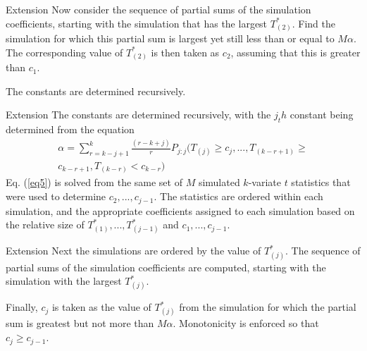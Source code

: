 \documentclass{beamer}
\begin{document}
\begin{frame}[t]{Extension}\vspace{10pt}
Now consider the sequence of partial sums of the simulation coefficients, starting with the simulation that has the largest $T^*_{(2)}$. Find the simulation for which this partial sum is largest yet still less than or equal to $M\alpha$. The corresponding value of $T^*_{(2)}$ is then taken as $c_2$, assuming that this is greater than $c_1$.

The constants are determined recursively.
\end{frame}


\begin{frame}[t]{Extension}\vspace{10pt}
The constants are determined recursively, with the $j_th$ constant being determined from the equation
\begin{multline} \label{eq5}
\alpha = \sum_{r=k-j+1}^{k} \frac{(r-k+j)}{r}P_{j:j}(T_{(j)} \geq c_j,...,T_{(k-r+1)} \geq\\ 
c_{k-r+1}, T_{(k-r)} < c_{k-r}) 
\end{multline} 
Eq. (\ref{eq5}) is solved from the same set of $M$ simulated $k$-variate $t$ statistics that were used to determine $c_2,...,c_{j-1}$. The statistics are ordered within each simulation, and the appropriate coefficients assigned to each simulation based on the relative size of $T^*_{(1)},...,T^*_{(j-1)}$ and $c_1,...,c_{j-1}$.
\end{frame}

\begin{frame}[t]{Extension}\vspace{10pt}
Next the simulations are ordered by the value of $T^*_{(j)}$. The sequence of partial sums of the simulation coefficients are computed, starting with the simulation with the largest $T^*_{(j)}$.  

Finally, $c_j$ is taken as the value of $T^*_{(j)}$ from the simulation for which the partial sum is greatest but not more than $M\alpha$. Monotonicity
is enforced so that $c_j \geq c_{j-1}$.

\end{frame}
\end{document}
